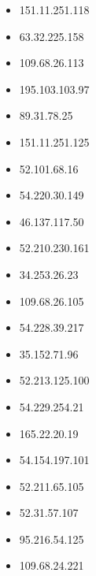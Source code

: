 \documentclass{article}
\begin{document}
\begin{itemize}
            \item 151.11.251.118
        
            \item 63.32.225.158
        
            \item 109.68.26.113
        
            \item 195.103.103.97
        
            \item 89.31.78.25
        
            \item 151.11.251.125
        
            \item 52.101.68.16
        
            \item 54.220.30.149
        
            \item 46.137.117.50
        
            \item 52.210.230.161
        
            \item 34.253.26.23
        
            \item 109.68.26.105
        
            \item 54.228.39.217
        
            \item 35.152.71.96
        
            \item 52.213.125.100
        
            \item 54.229.254.21
        
            \item 165.22.20.19
        
            \item 54.154.197.101
        
            \item 52.211.65.105
        
            \item 52.31.57.107
        
            \item 95.216.54.125
        
            \item 109.68.24.221
        

\end{itemize}
\end{document}
